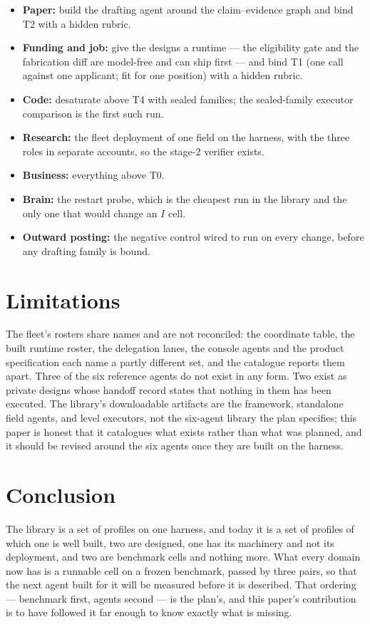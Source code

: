 \documentclass[11pt]{article}
\theoremstyle{definition}
\begin{document}
\begin{itemize}[leftmargin=*]
\item \textbf{Paper:} build the drafting agent around the claim--evidence graph and bind T2 with a hidden rubric.
\item \textbf{Funding and job:} give the designs a runtime --- the eligibility gate and the fabrication diff are model-free and can ship first --- and bind T1 (one call against one applicant; fit for one position) with a hidden rubric.
\item \textbf{Code:} desaturate above T4 with sealed families; the sealed-family executor comparison is the first such run.
\item \textbf{Research:} the fleet deployment of one field on the harness, with the three roles in separate accounts, so the stage-2 verifier exists.
\item \textbf{Business:} everything above T0.
\item \textbf{Brain:} the restart probe, which is the cheapest run in the library and the only one that would change an $I$ cell.
\item \textbf{Outward posting:} the negative control wired to run on every change, before any drafting family is bound.
\end{itemize}

\section{Limitations}\label{sec:limits}

The fleet's rosters share names and are not reconciled: the coordinate table, the built runtime roster, the delegation lanes, the console agents and the product specification each name a partly different set, and the catalogue reports them apart. Three of the six reference agents do not exist in any form. Two exist as private designs whose handoff record states that nothing in them has been executed. The library's downloadable artifacts are the framework, standalone field agents, and level executors, not the six-agent library the plan specifies; this paper is honest that it catalogues what exists rather than what was planned, and it should be revised around the six agents once they are built on the harness.

\section{Conclusion}

The library is a set of profiles on one harness, and today it is a set of profiles of which one is well built, two are designed, one has its machinery and not its deployment, and two are benchmark cells and nothing more. What every domain now has is a runnable cell on a frozen benchmark, passed by three pairs, so that the next agent built for it will be measured before it is described. That ordering --- benchmark first, agents second --- is the plan's, and this paper's contribution is to have followed it far enough to know exactly what is missing.
\end{document}
